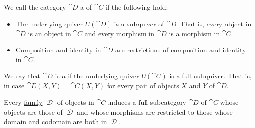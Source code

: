 \begin{definition}\label{def:subcategory}
  We call the category \( \cat{D} \) a  of \( \cat{C} \) if the following hold:
  \begin{itemize}
    \item The underlying quiver \( U(\cat{D}) \) is a \hyperref[eq:def:hypergraph/submodel]{subquiver} of \( \cat{D} \). That is, every object in \( \cat{D} \) is an object in \( \cat{C} \) and every morphism in \( \cat{D} \) is a morphism in \( \cat{C} \).
    \item Composition and identity in \( \cat{D} \) are \hyperref[def:multi_valued_function/restriction]{restrictions} of composition and identity in \( \cat{C} \).
  \end{itemize}

  We say that \( \cat{D} \) is a  if the underlying quiver \( U(\cat{C}) \) is a \hyperref[eq:def:hypergraph/submodel/full]{full subquiver}. That is, in case \( \cat{D}(X, Y) = \cat{C}(X, Y) \) for every pair of objects \( X \) and \( Y \) of \( \cat{D} \).

  Every \hyperref[rem:family_of_sets]{family} \( \mscrD \) of objects in \( \cat{C} \) induces a full subcategory \( \cat{D} \) of \( \cat{C} \) whose objects are those of \( \mscrD \) and whose morphisms are restricted to those whose domain and codomain are both in \( \mscrD \).
\end{definition}

